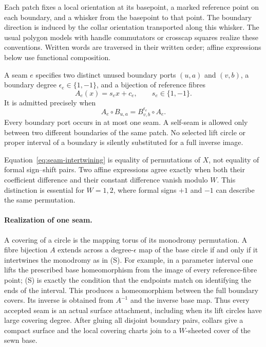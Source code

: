 Each patch fixes a local orientation at its basepoint, a marked reference
point on each boundary, and a whisker from the basepoint to that point.
The boundary direction is induced by the collar orientation transported
along this whisker.  The usual polygon models with handle commutators or
crosscap squares realize these conventions.  Written words are traversed
in their written order; affine expressions below use functional composition.

A seam $e$ specifies two distinct unused boundary ports $(u,a)$ and $(v,b)$,
a boundary degree $\epsilon_e\in\{1,-1\}$, and a bijection of reference
fibres
\[
 A_e(x)=s_ex+c_e,\qquad s_e\in\{1,-1\}.
\]
It is admitted precisely when
\begin{equation}
 A_e\circ B_{u,a}= B_{v,b}^{\epsilon_e}\circ A_e.
 \tag{S}\label{eq:seam-intertwining}
\end{equation}
Every boundary port occurs in at most one seam.  A self-seam is allowed
only between two different boundaries of the same patch.  No selected lift
circle or proper interval of a boundary is silently substituted for a full
inverse image.

Equation~\eqref{eq:seam-intertwining} is equality of permutations of $X$,
not equality of formal sign--shift pairs.  Two affine expressions agree
exactly when both their coefficient difference and their constant difference
vanish modulo $W$.  This distinction is essential for $W=1,2$, where formal
signs $+1$ and $-1$ can describe the same permutation.

\paragraph{Realization of one seam.}
A covering of a circle is the mapping torus of its monodromy permutation.
A fibre bijection $A$ extends across a degree-$\epsilon$ map of the base
circle if and only if it intertwines the monodromy as in (S).  For example,
in a parameter interval one lifts the prescribed base homeomorphism from
the image of every reference-fibre point; (S) is exactly the condition that
the endpoints match on identifying the ends of the interval.  This produces
a homeomorphism between the full boundary covers.  Its inverse is obtained
from $A^{-1}$ and the inverse base map.  Thus every accepted seam is an
actual surface attachment, including when its lift circles have large
covering degree.  After gluing all disjoint boundary pairs, collars give a
compact surface and the local covering charts join to a $W$-sheeted cover
of the sewn base.

